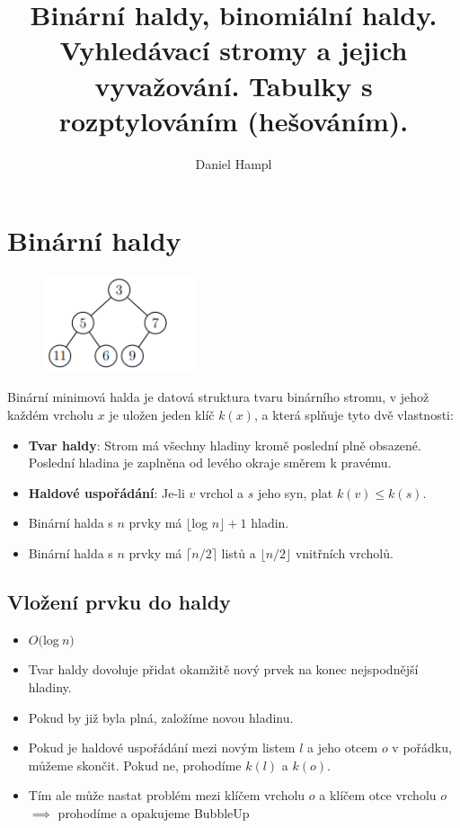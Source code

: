 \documentclass{szzclass}
\title{Binární haldy, binomiální haldy. Vyhledávací stromy a   jejich vyvažování. Tabulky s rozptylováním (hešováním).}
\author{Daniel Hampl}
\begin{document}
\maketitle

\tableofcontents
\newpage

\section{Binární haldy}

\begin{figure}[h]
\centering
\includegraphics[width=0.4\textwidth]{topics/bi-spol-05/images/binary-heap.png}
\end{figure}

Binární minimová halda je datová struktura tvaru binárního
stromu, v jehož každém vrcholu $x$ je uložen jeden klíč $k(x)$, a která
splňuje tyto dvě vlastnosti:
\begin{itemize}
    \item \textbf{Tvar haldy}: Strom má všechny hladiny kromě poslední plně
    obsazené. Poslední hladina je zaplněna od levého okraje směrem k pravému.
    \item \textbf{Haldové uspořádání}: Je-li $v$ vrchol a $s$ jeho syn, plat $k(v) ≤ k(s)$.
    \item Binární halda s $n$ prvky má $\lfloor $log $ n \rfloor + 1$ hladin.
    \item Binární halda s $n$ prvky má $\lceil n/2\rceil$ listů a $\lfloor n/2 \rfloor$ vnitřních vrcholů.
\end{itemize}

\subsection{Vložení prvku do haldy}
\begin{itemize}
    \item $O($log$~n)$
    \item Tvar haldy dovoluje přidat okamžitě nový prvek na konec nejspodnější hladiny.
    \item Pokud by již byla plná, založíme novou hladinu.
    \item Pokud je haldové uspořádání mezi novým listem $l$ a jeho otcem $o$ v pořádku, můžeme skončit. Pokud ne, prohodíme $k(l)$ a $k(o)$.
    \item Tím ale může nastat problém mezi klíčem vrcholu $o$ a klíčem otce vrcholu $o$ $\implies$  prohodíme a opakujeme BubbleUp
\end{itemize}
\end{document}
